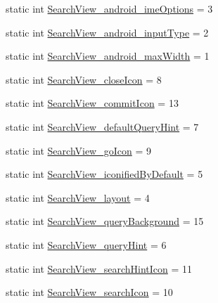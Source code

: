 \begin{DoxyCompactItemize}
static int \hyperlink{classandroid_1_1support_1_1v7_1_1mediarouter_1_1R_1_1styleable_aac95101925665a6dff1249a18559dad5}{Search\+View\+\_\+android\+\_\+ime\+Options} = 3
\item 
static int \hyperlink{classandroid_1_1support_1_1v7_1_1mediarouter_1_1R_1_1styleable_a2ba4d91c907ae2c795917d5130b61808}{Search\+View\+\_\+android\+\_\+input\+Type} = 2
\item 
static int \hyperlink{classandroid_1_1support_1_1v7_1_1mediarouter_1_1R_1_1styleable_a937cf9b30ff311ddda2782bc237be919}{Search\+View\+\_\+android\+\_\+max\+Width} = 1
\item 
static int \hyperlink{classandroid_1_1support_1_1v7_1_1mediarouter_1_1R_1_1styleable_adc953a78777a6f78846028fcb3c7c1aa}{Search\+View\+\_\+close\+Icon} = 8
\item 
static int \hyperlink{classandroid_1_1support_1_1v7_1_1mediarouter_1_1R_1_1styleable_ae0021e7caae5581aab60a4f50e79af40}{Search\+View\+\_\+commit\+Icon} = 13
\item 
static int \hyperlink{classandroid_1_1support_1_1v7_1_1mediarouter_1_1R_1_1styleable_a4bee2315e2c3bab5b734df62936a8ad9}{Search\+View\+\_\+default\+Query\+Hint} = 7
\item 
static int \hyperlink{classandroid_1_1support_1_1v7_1_1mediarouter_1_1R_1_1styleable_a3caf53e79313da629e99a8bb5fe0a8f8}{Search\+View\+\_\+go\+Icon} = 9
\item 
static int \hyperlink{classandroid_1_1support_1_1v7_1_1mediarouter_1_1R_1_1styleable_a8d919271ebc1a35d5b4d097c8a4fef08}{Search\+View\+\_\+iconified\+By\+Default} = 5
\item 
static int \hyperlink{classandroid_1_1support_1_1v7_1_1mediarouter_1_1R_1_1styleable_a0261fec701a8d342dc4392b2612e4fdc}{Search\+View\+\_\+layout} = 4
\item 
static int \hyperlink{classandroid_1_1support_1_1v7_1_1mediarouter_1_1R_1_1styleable_a3ac6b81bd921b428110700ffe00dfa9f}{Search\+View\+\_\+query\+Background} = 15
\item 
static int \hyperlink{classandroid_1_1support_1_1v7_1_1mediarouter_1_1R_1_1styleable_a8a63f4bf8bd850c17ab2faf9d9eb2305}{Search\+View\+\_\+query\+Hint} = 6
\item 
static int \hyperlink{classandroid_1_1support_1_1v7_1_1mediarouter_1_1R_1_1styleable_aee7fbb570a505fe3f44e8575152ffd62}{Search\+View\+\_\+search\+Hint\+Icon} = 11
\item 
static int \hyperlink{classandroid_1_1support_1_1v7_1_1mediarouter_1_1R_1_1styleable_ab07321daa4d83a526ba178c813f21613}{Search\+View\+\_\+search\+Icon} = 10

\end{DoxyCompactItemize}
